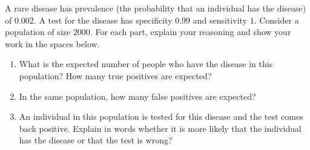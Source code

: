 \documentclass[../main.tex]{subfiles}
\begin{document}
\begin{exercise} \label{ex:errors-midterm-2024}
  A rare disease has prevalence (the probability that an individual has the disease) of \(0.002\). A test for the disease has specificity \(0.99\) and sensitivity \(1\). Consider a population of size \(2000\).  For each part, explain your reasoning and show your work in the spaces below.

  \begin{enumerate}
    \item What is the expected number of people who have the disease in this population? How many true positives are expected?
      
    \item In the same population, how many  false positives are expected?

    \item An individual in this population is tested for this disease and the test comes back positive. Explain in words whether it is more likely that the individual has the disease or that the test is wrong?
  \end{enumerate}

\end{exercise}
%
%
%
%
%
%
%
\end{document}
